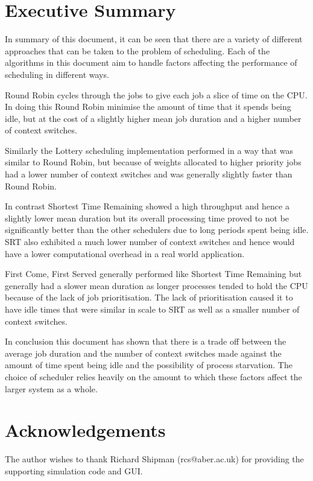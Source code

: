 \documentclass{acm_proc_article-sp}
\begin{document}
\section{Executive Summary}
In summary of this document, it can be seen that there are a variety of different approaches that can be taken to the problem of scheduling. Each of the algorithms in this document aim to handle factors affecting the performance of scheduling in different ways. 

Round Robin cycles through the jobs to give each job a slice of time on the CPU. In doing this Round Robin minimise the amount of time that it spends being idle, but at the cost of a slightly higher mean job duration and a higher number of context switches.

Similarly the Lottery scheduling implementation performed in a way that was similar to Round Robin, but because of weights allocated to higher priority jobs had a lower number of context switches and was generally slightly faster than Round Robin. 

In contrast Shortest Time Remaining showed a high throughput and hence a slightly lower mean duration but its overall processing time proved to not be significantly better than the other schedulers due to long periods spent being idle. SRT also exhibited a much lower number of context switches and hence would have a lower computational overhead in a real world application.

First Come, First Served generally performed like Shortest Time Remaining but generally had a slower mean duration as longer processes tended to hold the CPU because of the lack of job prioritisation. The lack of prioritisation caused it to have idle times that were similar in scale to SRT as well as a smaller number of context switches.

In conclusion this document has shown that there is a trade off between the average job duration and the number of context switches made against the amount of time spent being idle and the possibility of process starvation. The choice of scheduler relies heavily on the amount to which these factors affect the larger system as a whole.

\section{Acknowledgements}
The author wishes to thank Richard Shipman (rcs@aber.ac.uk) for providing the supporting simulation code and GUI.


\balancecolumns


\end{document}
